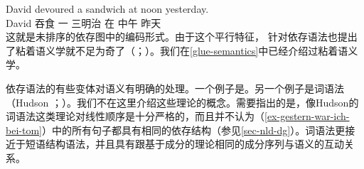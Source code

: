 \ea
\label{ex-david-devoured-a-sandwich-at-noon-yesterday-two}
\gll David devoured a sandwich at noon yesterday.\\
David 吞食 一 三明治 在 中午 昨天\\
\z
这就是未排序的依存图中的编码形式。由于这个平行特征， \citet[]{Broeker2003a-u}针对依存语法也提出了粘着语义学就不足为奇了（\citealp*{DLS93a-u}；\citealp[\S~8]{Dalrymple2001a-u}）。我们在\ref{glue-semantics}中已经介绍过粘着语义学。

依存语法的有些变体对语义有明确的处理。一个例子是\mttc \citep{Melcuk88a-u}。另一个例子是词语法（Hudson \citeyear[\S~7]{Hudson91a-u}；\citeyear[\S~5]{Hudson2007a-u}）。我们不在这里介绍这些理论的概念。需要指出的是，像Hudson的词语法这类理论对线性顺序是十分严格的，而且并不认为（\ref{ex-gestern-war-ich-bei-tom}）中的所有句子都具有相同的依存结构（参见\ref{sec-nld-dg}）。词语法更接近于短语结构语法，并且具有跟基于成分的理论相同的成分序列与语义的互动关系。



